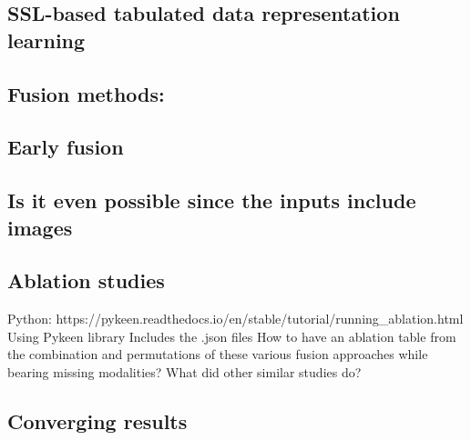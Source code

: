 \documentclass{article}%
\begin{document}
%
\subsection{SSL{-}based tabulated data representation learning }%
\label{subsec:SSL{-}basedtabulateddatarepresentationlearning}%

%
\subsection{Fusion methods: }%
\label{subsec:Fusionmethods}%

%
\subsection{Early fusion}%
\label{subsec:Earlyfusion}%

%
\subsection{Is it even possible since the inputs include images }%
\label{subsec:Isitevenpossiblesincetheinputsincludeimages}%

%
\subsection{Ablation studies }%
\label{subsec:Ablationstudies}%

%
Python: https://pykeen.readthedocs.io/en/stable/tutorial/running\_ablation.html %
\newline%
\newline%
%
Using Pykeen library%
\newline%
\newline%
%
Includes the .json files %
\newline%
\newline%
%
How to have an ablation table from the combination and permutations of these various fusion approaches while bearing missing modalities?%
\newline%
\newline%
%
What did other similar studies do? %
\newline%
\newline%
%
%
\newline%
\newline%
%
\subsection{Converging results }%
\label{subsec:Convergingresults}%
\end{document}
